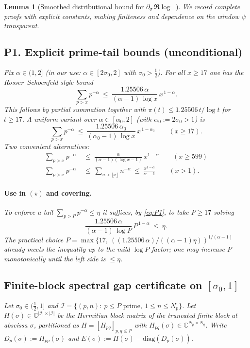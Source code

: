 \documentclass[11pt]{article}
\newtheorem{lemma}[theorem]{Lemma}
\theoremstyle{definition}
\theoremstyle{remark}
\newcommand{\C}{\mathbb{C}}
\DeclareMathOperator{\dettwo}{det_2}
\begin{document}
\begin{lemma}[Smoothed distributional bound for $\partial_\sigma\,\Re\log\dettwo$]
We record complete proofs with explicit constants, making finiteness and dependence on the window $\psi$ transparent.

\subsection*{P1. Explicit prime-tail bounds (unconditional)}\label{subsec:prime-tail}
Fix $\alpha\in(1,2]$ (in our use: $\alpha\in[2\sigma_0,2]$ with $\sigma_0>\tfrac12$). For all $x\ge 17$ one has the Rosser--Schoenfeld style bound
\begin{equation}\label{eq:P1}
 \sum_{p>x} p^{-\alpha}\ \le\ \frac{1.25506\,\alpha}{(\alpha-1)\,\log x}\,x^{\,1-\alpha}.
\end{equation}
This follows by partial summation together with $\pi(t)\le 1.25506\,t/\log t$ for $t\ge 17$. A uniform variant over $\alpha\in[\alpha_0,2]$ (with $\alpha_0:=2\sigma_0>1$) is
\begin{equation}\label{eq:P1uniform}
 \sum_{p>x} p^{-\alpha}\ \le\ \frac{1.25506\,\alpha_0}{(\alpha_0-1)\,\log x}\,x^{\,1-\alpha_0}\qquad(x\ge 17).
\end{equation}
Two convenient alternatives:
\begin{align}
 \sum_{p>x}p^{-\alpha}&\ \le\ \frac{\alpha}{(\alpha-1)(\log x-1)}\,x^{1-\alpha}\qquad(x\ge 599)\label{eq:P1dusart}\\
 \sum_{p>x}p^{-\alpha}&\ \le\ \sum_{n>\lfloor x\rfloor}n^{-\alpha}\ \le\ \frac{x^{1-\alpha}}{\alpha-1}\qquad(x>1).\label{eq:P1triv}
\end{align}
\paragraph{Use in $(\star)$ and covering.}
To enforce a tail $\sum_{p>P}p^{-\alpha}\le \eta$ it suffices, by \eqref{eq:P1}, to take $P\ge17$ solving
\[
 \frac{1.25506\,\alpha}{(\alpha-1)\,\log P}\,P^{\,1-\alpha}\ \le\ \eta.
\]
The practical choice $P=\max\{17,\ ((1.25506\,\alpha)/((\alpha-1)\eta))^{1/(\alpha-1)}$ already meets the inequality up to the mild $\log P$ factor; one may increase $P$ monotonically until the left side is $\le\eta$.
\subsection*{Finite-block spectral gap certificate on $[\sigma_0,1]$}
Let $\sigma_0\in(\tfrac12,1]$ and $\mathcal I=\{(p,n):\ p\le P\text{ prime},\ 1\le n\le N_p\}$. Let $H(\sigma)\in\C^{|\mathcal I|\times|\mathcal I|}$ be the Hermitian block matrix of the truncated finite block at abscissa $\sigma$, partitioned as $H=[H_{pq}]_{p,q\le P}$ with $H_{pq}(\sigma)\in\C^{N_p\times N_q}$. Write $D_p(\sigma):=H_{pp}(\sigma)$ and $E(\sigma):=H(\sigma)-\mathrm{diag}(D_p(\sigma))$.


\end{lemma}
\end{document}
